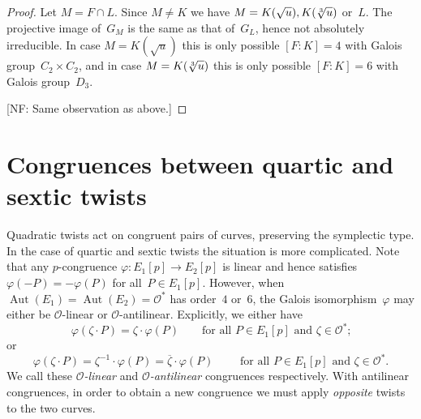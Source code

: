 \documentclass[12pt, reqno]{amsart}
\newcommand{\calO}{\mathcal{O}}
\DeclareMathOperator{\Aut}{Aut}
\numberwithin{equation}{section}
\theoremstyle{definition}
\theoremstyle{remark}
\newcommand{\nf}[1]{{\color{blue} \textsf{[NF: #1]}}}
\newcommand{\jc}[1]{{\color{darkgreen} \textsf{[JC: #1]}}}
\begin{document}
\begin{proof}
Let $M = F \cap L$.  Since $M\not=K$ we have $M = K(\sqrt{u}), K(\root
3 \of{u})$ or~$L$.  The projective image of~$G_M$ is the same as that
of~$G_L$, hence not absolutely irreducible.  In case $M=K(\sqrt{u})$
this is only possible $[F:K]=4$ with Galois group~$C_2\times C_2$, and
in case $M=K(\root3\of{u})$ this is only possible $[F:K]=6$ with
Galois group~$D_3$.

\nf{Same observation as above.}


\begin{comment}Suppose $M = K(\root 3 \of{u})$ or $M = K(\sqrt{u}) \neq
K(\sqrt{-3})$.  Arguing as in case (ii) with $E/M$ gives the desired
conclusion.

\jc{What if $M = K(\root 3 \of{u})$ and $[F:K]=6$, then $[F:M]=2$ and
  we lose absolute irreducibility over~$M$? }

We are left with the case $M = K(\sqrt{-3})$. This means that $u = -3
s^2$ with $s \in K$ and so $u = -27 s_0^2$ with $s_0 \in K$. Thus
applying to~$E'$ the $3$-isogeny from Remark~\ref{R:3-isog} reduces to
the case $u = s_0^2$. The result again follows from (i).
\end{comment}

\end{proof}

\section{Congruences between quartic and sextic twists}\label{S:cong-twist-46}

Quadratic twists act on congruent pairs of curves, preserving the
symplectic type.  In the case of quartic and sextic twists the
situation is more complicated.  Note that any $p$-congruence
$\varphi:E_1[p]\to E_2[p]$ is linear and hence satisfies
$\varphi(-P)=-\varphi(P)$ for all~$P\in E_1[p]$.  However, when
$\Aut(E_1)=\Aut(E_2)=\calO^*$ has order~$4$ or~$6$, the Galois
isomorphism~$\varphi$ may either be $\calO$-linear or
$\calO$-antilinear.  Explicitly, we either have
\begin{equation}\label{E:forward-congruence}
\varphi(\zeta\cdot P) = \zeta\cdot\varphi(P)
\qquad\text{for all~$P\in  E_1[p]$ and~$\zeta\in\calO^*$;}
\end{equation}
or
\begin{equation}\label{E:backward-congruence}
\varphi(\zeta\cdot P) = \zeta^{-1}\cdot\varphi(P) = \overline\zeta\cdot\varphi(P)
\qquad\text{ for all~$P\in E_1[p]$ and~$\zeta\in\calO^*$.}
\end{equation}
We call these \emph{$\calO$-linear} and \emph{$\calO$-antilinear}
congruences respectively.  With antilinear congruences, in order to
obtain a new congruence we must apply \emph{opposite} twists to the
two curves.
\end{document}
